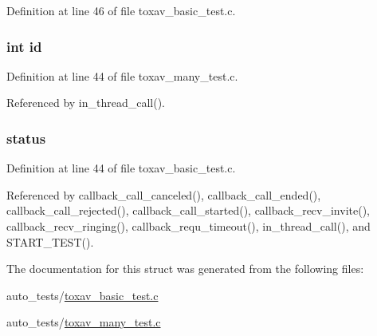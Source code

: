 Definition at line 46 of file toxav\+\_\+basic\+\_\+test.\+c.

\hypertarget{struct___party_a7441ef0865bcb3db9b8064dd7375c1ea}{
\subsubsection[{id}]{\setlength{\rightskip}{0pt plus 5cm}int id}}\label{struct___party_a7441ef0865bcb3db9b8064dd7375c1ea}


Definition at line 44 of file toxav\+\_\+many\+\_\+test.\+c.



Referenced by in\+\_\+thread\+\_\+call().

\hypertarget{struct___party_a722fcd2c2e22cc6de0a53383e5871290}{
\subsubsection[{status}]{ status}}\label{struct___party_a722fcd2c2e22cc6de0a53383e5871290}


Definition at line 44 of file toxav\+\_\+basic\+\_\+test.\+c.



Referenced by callback\+\_\+call\+\_\+canceled(), callback\+\_\+call\+\_\+ended(), callback\+\_\+call\+\_\+rejected(), callback\+\_\+call\+\_\+started(), callback\+\_\+recv\+\_\+invite(), callback\+\_\+recv\+\_\+ringing(), callback\+\_\+requ\+\_\+timeout(), in\+\_\+thread\+\_\+call(), and S\+T\+A\+R\+T\+\_\+\+T\+E\+S\+T().



The documentation for this struct was generated from the following files\+:\begin{DoxyCompactItemize}
\item 
auto\+\_\+tests/\hyperlink{toxav__basic__test_8c}{toxav\+\_\+basic\+\_\+test.\+c}\item 
auto\+\_\+tests/\hyperlink{toxav__many__test_8c}{toxav\+\_\+many\+\_\+test.\+c}\end{DoxyCompactItemize}
